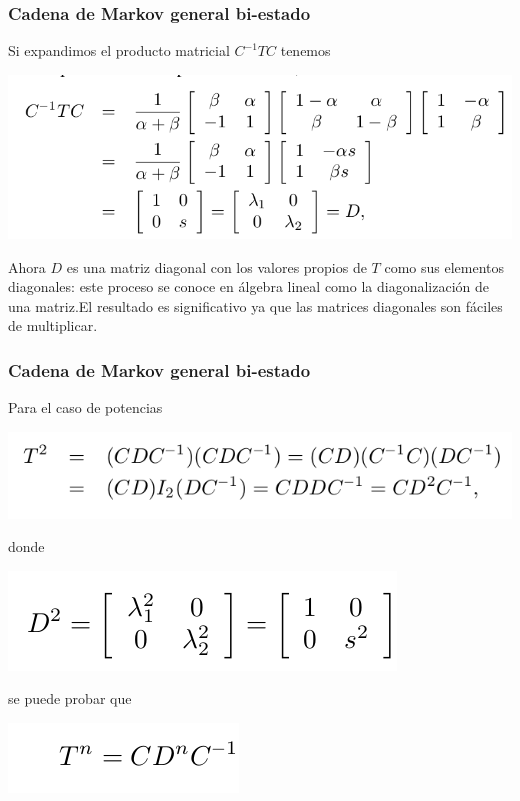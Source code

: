 \documentclass[spanish]{beamer}
\begin{document}
\begin{frame}
\frametitle{Cadena de Markov general bi-estado}
Si expandimos el producto matricial $C^{-1}TC$ tenemos 
\begin{center}
\includegraphics[scale=0.4]{im11}
\end{center}
Ahora $D$ es una matriz diagonal con los valores propios de $T$ como sus elementos diagonales: este proceso se conoce en álgebra lineal como la diagonalización de una matriz.El resultado es significativo ya que las matrices diagonales son fáciles de multiplicar.
\end{frame}
\begin{frame}
\frametitle{Cadena de Markov general bi-estado}
Para el caso de potencias
\begin{center}
\includegraphics[scale=0.4]{im12}
\end{center}
donde
\begin{center}
\includegraphics[scale=0.4]{im13}
\end{center}
se puede probar que 
\begin{center}
\includegraphics[scale=0.4]{im14}
\end{center}
\end{frame}
\end{document}
